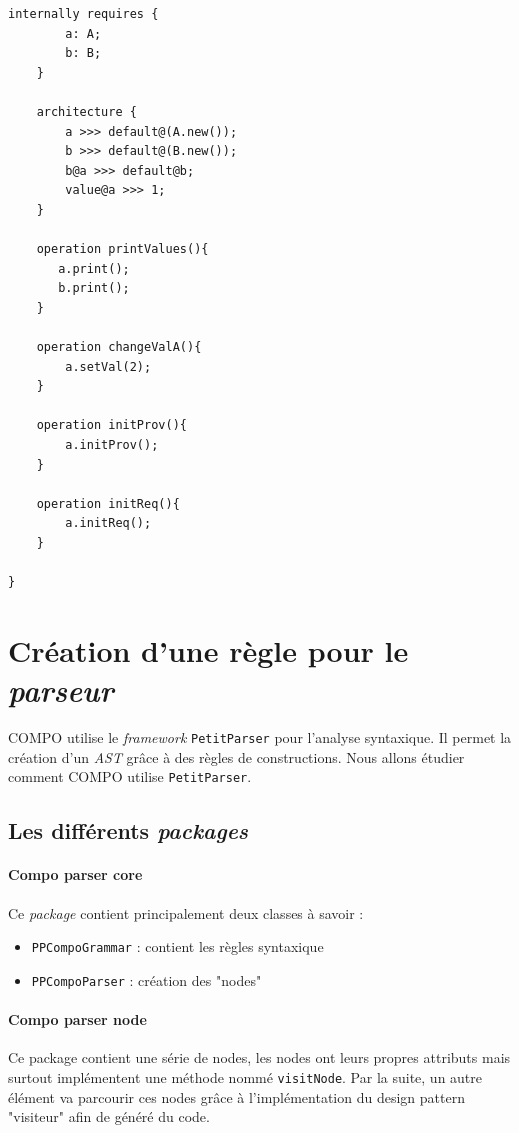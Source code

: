\documentclass[11pt,a4paper,openany,oneside]{book}
\begin{document}
\begin{appendices}
\begin{lstlisting}[language=Compo, frame=single, caption=Programme]
	internally requires {
		a: A;
		b: B;
	}
	
	architecture {
		a >>> default@(A.new());
		b >>> default@(B.new());
		b@a >>> default@b;
		value@a >>> 1;
	}
	
	operation printValues(){
	   a.print();
	   b.print();
	}
	
	operation changeValA(){
	    a.setVal(2);
	}
	
	operation initProv(){
	    a.initProv();
	}
	
	operation initReq(){
	    a.initReq();
	}
	
}
\end{lstlisting}





\chapter{Création d'une règle pour le \textit{parseur}}

COMPO utilise le \textit{framework} \texttt{PetitParser} pour l'analyse syntaxique. Il permet la création d'un \textit{AST} grâce à des règles de constructions. Nous allons étudier comment COMPO utilise \texttt{PetitParser}.

\section*{Les différents \textit{packages}}

\subsubsection{Compo parser core}
Ce \textit{package} contient principalement deux classes à savoir :

\begin{itemize}
\item \texttt{PPCompoGrammar} : contient les règles syntaxique
\item \texttt{PPCompoParser} : création des "nodes"
\end{itemize}
	
\subsubsection{Compo parser node}
Ce package contient une série de nodes, les nodes ont leurs propres attributs mais surtout implémentent une méthode nommé \texttt{visitNode}.
Par la suite, un autre élément va parcourir ces nodes grâce à l'implémentation du design pattern "visiteur" afin de généré du code.


\end{appendices}
\end{document}
